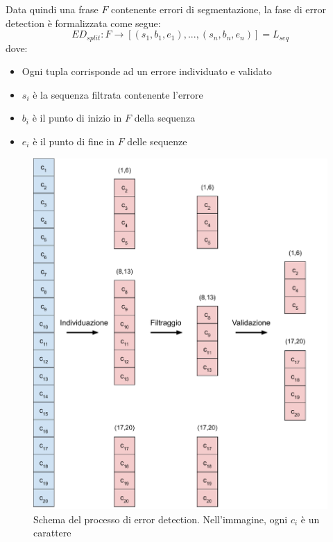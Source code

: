 Data quindi una frase $F$ contenente errori di segmentazione, la fase di error detection è formalizzata come segue:
\begin{equation}
\textit{ED}_{split}: F \rightarrow [(s_1,b_1,e_1),...,(s_n,b_n,e_n)] = L_{seq}
\end{equation}
dove:
\begin{itemize}
\item Ogni tupla corrisponde ad un errore individuato e validato
\item $s_i$ è la sequenza filtrata contenente l'errore
\item $b_i$ è il punto di inizio in $F$ della sequenza
\item $e_i$ è il punto di fine in $F$ delle sequenze
\end{itemize}

\begin{figure}[H]
\centering
\includegraphics[width=\textwidth]{immagini/metodologia/split_error_detection}
\caption{Schema del processo di error detection. Nell'immagine, ogni $c_i$ è un carattere}
\label{fig:met_split_errdet}
\end{figure}

